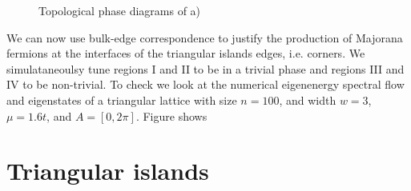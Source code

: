 \documentclass[aps,prb,showpacs,amsmath,amssymb,superscriptaddress]{revtex4-2}
\begin{document}
\begin{figure}[]
  \hfill
  \hfill
  \label{fig: majorana-number}
  \caption{Topological phase diagrams of a)}
\end{figure}

We can now use bulk-edge correspondence to justify the production of Majorana fermions at the interfaces of the triangular islands edges, i.e. corners.
We simulataneoulsy tune regions I and II to be in a trivial phase and regions III and IV to be non-trivial.
To check we look at the numerical eigenenergy spectral flow and eigenstates of a triangular lattice with size $n=100$, and width $w=3$, $\mu=1.6t$, and $A = [0,2\pi]$.
Figure  shows

\section{Triangular islands}
\end{document}
